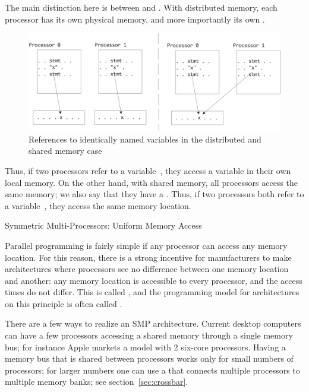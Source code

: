 The main distinction here is between
 and
. With distributed memory, each processor
has its own physical memory, and more importantly its own
.
\begin{figure}
  \includegraphics[scale=.1]{graphics-public/shared-distributed}
  \caption{References to identically named variables in the
    distributed and shared memory case}
  \label{fig:shared-distributed}
\end{figure}
Thus, if two processors refer to a variable~, they access a
variable in their own local memory. On the other hand, with shared
memory, all processors access the same memory; we also say that they
have a . Thus, if two processors
both refer to a variable~, they access the same memory location.

 {Symmetric Multi-Processors: Uniform Memory Access}
\label{sec:uma}

Parallel programming is fairly simple if any processor can access any
memory location. For this reason, there is a strong incentive for
manufacturers to make architectures where processors see no difference
between one memory location and another: any memory location is
accessible to every processor, and
the access times do not differ. This is called , and 
the programming model for
architectures on this principle is often called .

There are a few ways to realize an SMP architecture.  Current desktop
computers can have a few processors accessing a shared memory through
a single memory bus; for instance Apple markets a model with 2
six-core processors. Having a memory bus that is shared between
processors works only for small numbers of processors; for larger
numbers one can use a  that connects multiple
processors to multiple memory banks; see section~\ref{sec:crossbar}.

